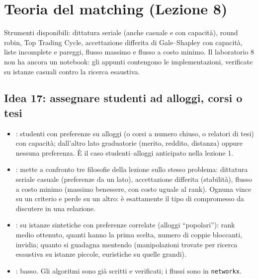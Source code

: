 \documentclass[11pt, a4paper, oneside, openany]{book}
\newcommand{\stato}[2]{\etichetta{#1}{#2}}
\newcommand{\sbloccata}[1]{\stato{blu}{DA LEZIONE #1}}
\begin{document}
\section{Teoria del matching (Lezione 8)}

Strumenti disponibili: dittatura seriale (anche casuale e con capacità), round robin, Top
Trading Cycle, accettazione differita di Gale--Shapley con capacità, liste incomplete e
pareggi, flusso massimo e flusso a costo minimo. Il laboratorio 8 non ha ancora un notebook:
gli appunti contengono le implementazioni, verificate su istanze casuali contro la ricerca
esaustiva.

\subsection*{Idea 17: assegnare studenti ad alloggi, corsi o tesi \hfill\sbloccata{8}}
\begin{itemize}
  \item {}: studenti con preferenze su alloggi (o corsi a numero chiuso, o
        relatori di tesi) con capacità; dall'altro lato graduatorie (merito, reddito,
        distanza) oppure nessuna preferenza. È il caso studenti--alloggi anticipato
        nella lezione 1.
  \item {}: mette a confronto tre filosofie della lezione sullo
        stesso problema: dittatura seriale casuale (preferenze da un lato), accettazione
        differita (stabilità), flusso a costo minimo (massimo benessere, con costo uguale al
        rank). Ognuna vince su un criterio e perde su un altro: è esattamente il tipo di
        compromesso da discutere in una relazione.
  \item {}: su istanze sintetiche con preferenze correlate (alloggi
        ``popolari''): rank medio ottenuto, quanti hanno la prima scelta, numero di coppie
        bloccanti, invidia; quanto si guadagna mentendo (manipolazioni trovate per ricerca
        esaustiva su istanze piccole, euristiche su quelle grandi).
  \item {}: basso. Gli algoritmi sono già scritti e verificati; i flussi sono in
        \texttt{networkx}.
\end{itemize}
\end{document}
